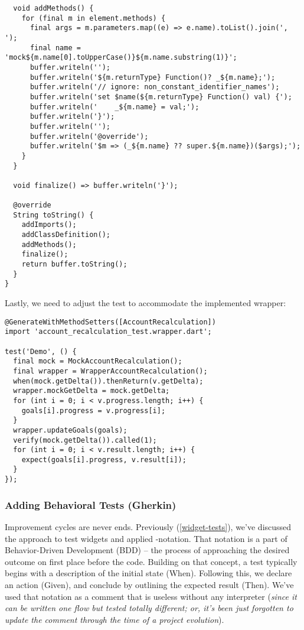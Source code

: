 \begin{lstlisting}
  void addMethods() {
    for (final m in element.methods) {
      final args = m.parameters.map((e) => e.name).toList().join(', ');
      final name = 'mock${m.name[0].toUpperCase()}${m.name.substring(1)}';
      buffer.writeln('');
      buffer.writeln('${m.returnType} Function()? _${m.name};');
      buffer.writeln('// ignore: non_constant_identifier_names');
      buffer.writeln('set $name(${m.returnType} Function() val) {');
      buffer.writeln('    _${m.name} = val;');
      buffer.writeln('}');
      buffer.writeln('');
      buffer.writeln('@override');
      buffer.writeln('$m => (_${m.name} ?? super.${m.name})($args);');
    }
  }

  void finalize() => buffer.writeln('}');

  @override
  String toString() {
    addImports();
    addClassDefinition();
    addMethods();
    finalize();
    return buffer.toString();
  }
}
\end{lstlisting}

\noindent Lastly, we need to adjust the test to accommodate the implemented wrapper:

\begin{lstlisting}
@GenerateWithMethodSetters([AccountRecalculation])
import 'account_recalculation_test.wrapper.dart';

test('Demo', () {
  final mock = MockAccountRecalculation();
  final wrapper = WrapperAccountRecalculation();
  when(mock.getDelta()).thenReturn(v.getDelta);
  wrapper.mockGetDelta = mock.getDelta;
  for (int i = 0; i < v.progress.length; i++) {
    goals[i].progress = v.progress[i];
  }
  wrapper.updateGoals(goals);
  verify(mock.getDelta()).called(1);
  for (int i = 0; i < v.result.length; i++) {
    expect(goals[i].progress, v.result[i]);
  }
});
\end{lstlisting}


\subsubsection{Adding Behavioral Tests (Gherkin)} \label{t-gherkin}

Improvement cycles are never ends. Previously (\ref{widget-tests}), we've discussed the approach to test widgets and 
applied -notation. That notation is a part of Behavior-Driven Development (BDD) -- the 
process of approaching the desired outcome on first place before the code. Building on that concept, a test typically 
begins with a description of the initial state (When). Following this, we declare an action (Given), and conclude by 
outlining the expected result (Then). We've used that notation as a comment that is useless without any interpreter 
(\emph{since it can be written one flow but tested totally different; or, it's been just forgotten to update the comment 
through the time of a project evolution}).

